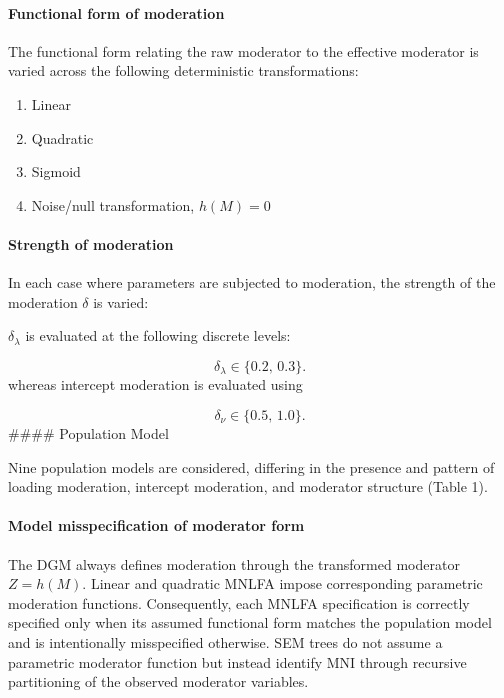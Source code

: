 \documentclass[
  man,
  floatsintext]{apa7}
\providecommand{\tightlist}{%
  \setlength{\itemsep}{0pt}\setlength{\parskip}{0pt}}
\begin{document}
\paragraph{Functional form of
moderation}\label{functional-form-of-moderation}

The functional form relating the raw moderator to the effective
moderator is varied across the following deterministic transformations:

\begin{enumerate}
\def\labelenumi{\arabic{enumi}.}
\tightlist
\item
  Linear\\
\item
  Quadratic\\
\item
  Sigmoid\\
\item
  Noise/null transformation, \(h(M)=0\)
\end{enumerate}

\paragraph{Strength of moderation}\label{strength-of-moderation}

In each case where parameters are subjected to moderation, the strength
of the moderation \(\delta\) is varied:

\(\delta_{\lambda}\) is evaluated at the following discrete levels:

\[
\delta_{\lambda} \in \{0.2,\,0.3\}.
\] whereas intercept moderation is evaluated using

\[
\delta_{\nu} \in \{0.5,\,1.0\}.
\] \#\#\#\# Population Model

Nine population models are considered, differing in the presence and
pattern of loading moderation, intercept moderation, and moderator
structure (Table 1).

\paragraph{Model misspecification of moderator
form}\label{model-misspecification-of-moderator-form}

The DGM always defines moderation through the transformed moderator
\(Z=h(M)\). Linear and quadratic MNLFA impose corresponding parametric
moderation functions. Consequently, each MNLFA specification is
correctly specified only when its assumed functional form matches the
population model and is intentionally misspecified otherwise. SEM trees
do not assume a parametric moderator function but instead identify MNI
through recursive partitioning of the observed moderator variables.
\end{document}
